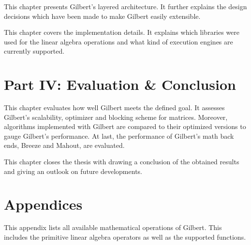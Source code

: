 \vspace{3mm}


\noindent This chapter presents Gilbert's layered architecture.
It further explains the design decisions which have been made to make Gilbert easily extensible.

\vspace{3mm}


\noindent This chapter covers the implementation details.
It explains which libraries were used for the linear algebra operations and what kind of execution engines are currently supported.

\vspace{3mm}

\section*{Part IV: Evaluation \& Conclusion}

\vspace{3mm}


This chapter evaluates how well Gilbert meets the defined goal.
It assesses Gilbert's scalability, optimizer and blocking scheme for matrices.
Moreover, algorithms implemented with Gilbert are compared to their optimized versions to gauge Gilbert's performance.
At last, the performance of Gilbert's math back ends, Breeze and Mahout, are evaluated.

\vspace{3mm}


This chapter closes the thesis with drawing a conclusion of the obtained results and giving an outlook on future developments.

\vspace{3mm}

\section*{Appendices}

\vspace{3mm}


This appendix lists all available mathematical operations of Gilbert.
This includes the primitive linear algebra operators as well as the supported functions.
